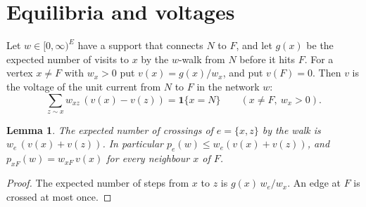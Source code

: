 \documentclass[11pt]{amsart}
\newtheorem{lemma}[theorem]{Lemma}
\theoremstyle{remark}
\newcommand{\one}{\mathbf{1}}
\begin{document}
\section{Equilibria and voltages}\label{sec:eq}

Let $w\in[0,\infty)^E$ have a support that connects $N$ to $F$, and let $g(x)$ be the expected number of visits to
$x$ by the $w$-walk from $N$ before it hits $F$. For a vertex $x\ne F$ with $w_x>0$ put $v(x)=g(x)/w_x$, and put
$v(F)=0$. Then $v$ is the voltage of the unit current from $N$ to $F$ in the network $w$:
\begin{equation}\label{eq:kirchhoff}
\sum_{z\sim x}w_{xz}\,(v(x)-v(z))=\one\{x=N\}\qquad(x\ne F,\ w_x>0).
\end{equation}

\begin{lemma}\label{lem:cross}
The expected number of crossings of $e=\{x,z\}$ by the walk is $w_e\,(v(x)+v(z))$. In particular
$p_e(w)\le w_e(v(x)+v(z))$, and $p_{xF}(w)=w_{xF}\,v(x)$ for every neighbour $x$ of $F$.
\end{lemma}
\begin{proof}
The expected number of steps from $x$ to $z$ is $g(x)\,w_e/w_x$. An edge at $F$ is crossed at most once.
\end{proof}
\end{document}
